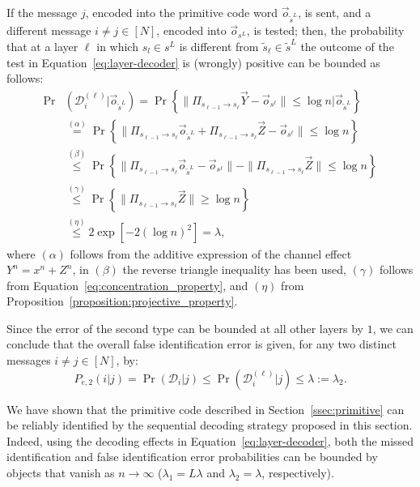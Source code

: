 \documentclass[10pt, conference]{IEEEtran}
\newcommand{\1}{\mathds{1}}
\newcommand{\cD}{\mathcal{D}}
\begin{document}
If the message $j$, encoded into the primitive code word $\vec o_{\tilde s^L}$, is sent, and a different message $i\neq j\in[N]$, encoded into $\vec o_{s^L}$, is tested; then, the probability that at a layer $\ell$ in which $s_l\in s^L$ is different from $\tilde s_\ell\in\tilde s^L$ the outcome of the test in Equation~\eqref{eq:layer-decoder} is (wrongly) positive can be bounded as follows:
\begin{align}
\Pr&(\cD_i^{(\ell)}|\vec o_{\tilde s^L})=\Pr\left\{\|\Pi_{s_{\ell-1}\to s_{\ell}}\vec{Y}-\vec{o}_{s^\ell}\|\leq\log n|\vec{o}_{\tilde{s}^{L}}\right\}\nonumber\\
&\!\stackrel{(\alpha)}{=}\Pr\left\{\|\Pi_{s_{\ell-1}\to s_{\ell}}\vec{o}_{\tilde{s}^{L}}+\Pi_{s_{\ell-1}\to s_{\ell}}\vec{Z}-\vec{o}_{s^\ell}\|\leq \log n\right\}\nonumber\\
&\!\stackrel{(\beta)}{\leq}\Pr\left\{\|\Pi_{s_{\ell-1}\to s_{\ell}}\vec{o}_{\tilde{s}^{L}}-\vec{o}_{s^\ell}\|-\|\Pi_{s_{\ell-1}\to s_{\ell}}\vec{Z}\|\leq\log n\right\}\nonumber\\
&\!\stackrel{(\gamma)}{\leq}\Pr\left\{\|\Pi_{s_{\ell-1}\to s_{\ell}}\vec{Z}\|\geq\log n\right\}\nonumber\\
&\!\stackrel{(\eta)}{\leq}2\exp\left[-2(\log n)^2\right]=\lambda,\label{eq:primitive_layer_error2}
\end{align}
where $(\alpha)$ follows from the additive expression of the channel effect $Y^n=x^n+Z^n$, in $(\beta)$ the reverse triangle inequality has been used, $(\gamma)$ follows from Equation~\eqref{eq:concentration_property}, and $(\eta)$ from Proposition~\ref{proposition:projective_property}.

Since the error of the second type can be bounded at all other layers by $1$, we can conclude that the overall false identification error is given, for any two distinct messages $i\neq j\in[N]$, by:
\begin{equation}\label{eq:main_Pe2}
P_{e,2}(i|j)=\Pr\left(\cD_i|j\right)\leq\Pr\left(\cD_i^{(\ell)}| j\right)\leq\lambda:=\lambda_2.
\end{equation}

We have shown that the primitive code described in Section~\ref{ssec:primitive} can be reliably identified by the sequential decoding strategy proposed in this section. Indeed, using the decoding effects in Equation~\eqref{eq:layer-decoder}, both the missed identification and false identification error probabilities can be bounded by objects that vanish as $n\to\infty$ ($\lambda_1=L\lambda$ and $\lambda_2=\lambda$, respectively).
\end{document}
